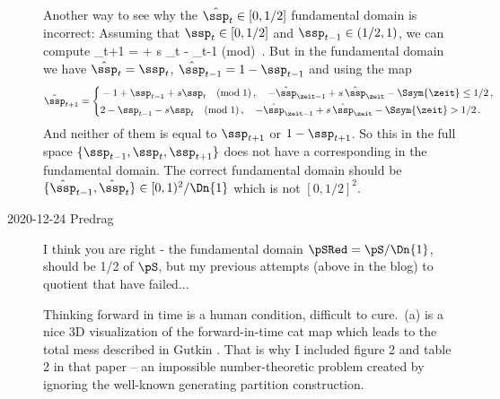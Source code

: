 \begin{description}
Another way to see why the $\hat{\ssp}_{t} \in [0,1/2]$ fundamental
domain is incorrect: Assuming that $\ssp_{t} \in [0,1/2]$ and $\ssp_{t-1}
\in (1/2,1)$, we can compute
\beq
\ssp_{t+1} = + s \ssp_{t}   - \ssp_{t-1} \quad (\mbox{mod})
\,.
But in the fundamental domain we have $\hat{\ssp}_{t} = \ssp_{t}$,
$\hat{\ssp}_{t-1} = 1 - \ssp_{t-1}$
and using the map 
\[
\hat{\ssp}_{t+1} =
\left\{
\begin{aligned}
&- 1 + \ssp_{t-1} + s \ssp_{t}   \quad (\mbox{mod}\;1) \,,
\quad - \hat{\ssp}_{\zeit-1}  +  s \, \hat{\ssp}_{\zeit} - \Ssym{\zeit} \leq 1/2  \,,\\
&2 - \ssp_{t-1} - s \ssp_{t}   \quad (\mbox{mod}\;1) \,,
\quad - \hat{\ssp}_{\zeit-1}  +  s \, \hat{\ssp}_{\zeit} - \Ssym{\zeit} > 1/2 \,.
 \end{aligned}\right.
\]
And neither of them is equal to $\ssp_{t+1}$ or $1-\ssp_{t+1}$.
So this {\lattstate} in the full space $\{\ssp_{t-1},\ssp_{t},\ssp_{t+1}\}$ does not have a
corresponding {\lattstate} in the fundamental domain. The correct fundamental
domain should be
$\{\hat{\ssp}_{t-1},\hat{\ssp}_{t}\}\in[0,1)^2/\Dn{1}$ which is not $[0,1/2]^2$.

    \item[2020-12-24 Predrag]
I think you are right - the fundamental domain $\pSRed=\pS/\Dn{1}$,
should be 1/2 of $\pS$, but my previous attempts (above in the blog) to
quotient that have failed...

Thinking forward in time is a human condition, difficult to cure.
\,(a) is a nice 3D visualization of the forward-in-time
 cat map which leads to the total mess described in
Gutkin \etal{}.
That is why I included
{figure 2} and
{table 2} in that paper – an impossible
number-theoretic problem created by ignoring the well-known generating
partition construction.


\end{description}
